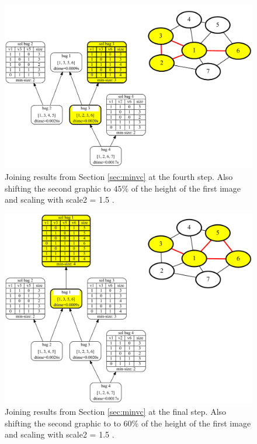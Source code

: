 \documentclass[a4paper, 12pt, bibliography=totoc]{scrartcl}
\begin{document}
\begin{figure}[H]
	\centering
	\includegraphics[width=0.9\linewidth,height=0.9\textheight,keepaspectratio]{images/SVGJOIN/default_06sc15_rise4.pdf}
	\caption[Comprehensive example joining results together step 4/5]{Joining results from Section \ref{sec:minvc} at the fourth step. Also shifting the second graphic to $45\%$ of the height of the first image and scaling with scale2 = 1.5 .}
	\label{fig:joinscaledrise4}
\end{figure}
\begin{figure}[H]
	\centering
	\includegraphics[width=0.9\linewidth,height=0.9\textheight,keepaspectratio]{images/SVGJOIN/default_06sc15_rise5.pdf}
	\caption[Comprehensive example joining results together final image]{Joining results from Section \ref{sec:minvc} at the final step. Also shifting the second graphic to to $60\%$ of the height of the first image and scaling with scale2 = 1.5 .}
	\label{fig:joinscaledrise5}
\end{figure}
\end{document}
